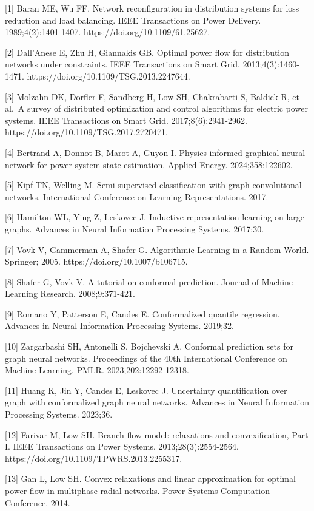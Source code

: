 \documentclass[
  preprint,12pt]{elsarticle}
\begin{document}
{[}1{]} Baran ME, Wu FF. Network reconfiguration in distribution systems
for loss reduction and load balancing. IEEE Transactions on Power
Delivery. 1989;4(2):1401-1407. https://doi.org/10.1109/61.25627.

{[}2{]} Dall'Anese E, Zhu H, Giannakis GB. Optimal power flow for
distribution networks under constraints. IEEE Transactions on Smart
Grid. 2013;4(3):1460-1471. https://doi.org/10.1109/TSG.2013.2247644.

{[}3{]} Molzahn DK, Dorfler F, Sandberg H, Low SH, Chakrabarti S,
Baldick R, et al.~A survey of distributed optimization and control
algorithms for electric power systems. IEEE Transactions on Smart Grid.
2017;8(6):2941-2962. https://doi.org/10.1109/TSG.2017.2720471.

{[}4{]} Bertrand A, Donnot B, Marot A, Guyon I. Physics-informed
graphical neural network for power system state estimation. Applied
Energy. 2024;358:122602.

{[}5{]} Kipf TN, Welling M. Semi-supervised classification with graph
convolutional networks. International Conference on Learning
Representations. 2017.

{[}6{]} Hamilton WL, Ying Z, Leskovec J. Inductive representation
learning on large graphs. Advances in Neural Information Processing
Systems. 2017;30.

{[}7{]} Vovk V, Gammerman A, Shafer G. Algorithmic Learning in a Random
World. Springer; 2005. https://doi.org/10.1007/b106715.

{[}8{]} Shafer G, Vovk V. A tutorial on conformal prediction. Journal of
Machine Learning Research. 2008;9:371-421.

{[}9{]} Romano Y, Patterson E, Candes E. Conformalized quantile
regression. Advances in Neural Information Processing Systems. 2019;32.

{[}10{]} Zargarbashi SH, Antonelli S, Bojchevski A. Conformal prediction
sets for graph neural networks. Proceedings of the 40th International
Conference on Machine Learning. PMLR. 2023;202:12292-12318.

{[}11{]} Huang K, Jin Y, Candes E, Leskovec J. Uncertainty
quantification over graph with conformalized graph neural networks.
Advances in Neural Information Processing Systems. 2023;36.

{[}12{]} Farivar M, Low SH. Branch flow model: relaxations and
convexification, Part I. IEEE Transactions on Power Systems.
2013;28(3):2554-2564. https://doi.org/10.1109/TPWRS.2013.2255317.

{[}13{]} Gan L, Low SH. Convex relaxations and linear approximation for
optimal power flow in multiphase radial networks. Power Systems
Computation Conference. 2014.
\end{document}
